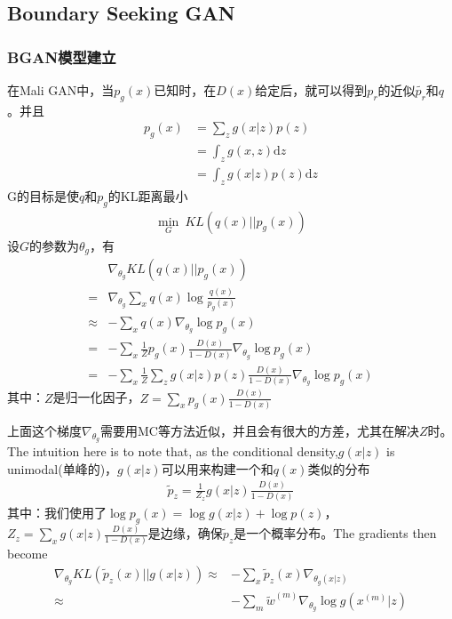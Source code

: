     \subsection{Boundary Seeking GAN}
        \subsubsection{BGAN模型建立}
            \par
            在Mali GAN中，当$p_g(x)$已知时，在$D(x)$给定后，就可以得到$p_r$的近似$\tilde{p_r}$和$q$。并且
            \begin{align*}
            p_g(x) & = \sum_z g(x|z)p(z)\\
            & =\int_zg(x,z)\mathrm{d}z\\
            & =\int_z g(x|z)p(z)\mathrm{d}z
            \end{align*}
            G的目标是使$q$和$p_g$的KL距离最小
            \begin{align*}
            \min_G \ KL(q(x)||p_g(x))
            \end{align*}
            设$G$的参数为$\theta_g$，有
            \begin{align*}
            &\nabla_{\theta_g} KL(q(x)||p_g(x))\\
            ={}&\nabla_{\theta_g} \sum_x q(x)\log \frac{q(x)}{p_g(x)}\\
            \approx{}&-\sum_x q(x)\nabla_{\theta_g}\log p_g(x)\\
            ={}&-\sum_x \frac{1}{Z}p_g(x)\frac{D(x)}{1-D(x)} \nabla_{\theta_g}\log p_g(x)\\
            ={}&-\sum_x \frac{1}{Z}\sum_z g(x|z)p(z)\frac{D(x)}{1-D(x)}\nabla_{\theta_g}\log p_g(x)
            \end{align*}
            其中：$Z$是归一化因子，$Z = \sum _x p_g(x)\frac{D(x)}{1-D(x)}$
            \par
            上面这个梯度$\nabla_{\theta_g}$需要用MC等方法近似，并且会有很大的方差，尤其在解决$Z$时。The intuition here is to note that, as the conditional density,$ g(x|z)$ is unimodal(单峰的)，$g(x|z)$可以用来构建一个和$q(x)$类似的分布
            \begin{align*}
            \tilde{p}_z = \frac{1}{Z_z} g(x|z) \frac{D(x)}{1-D(x)}
            \end{align*}
            其中：我们使用了$\log p_g(x) = \log g(x|z) + \log p(z)$，$Z_z = \sum_x g(x|z) \frac{D(x)}{1-D(x)}$是边缘，确保$\tilde{p}_z$是一个概率分布。The gradients then become
            \begin{align*}
            \nabla_{\theta_g} KL(\tilde{p}_z(x)||g(x|z)) \approx& -\sum _x\tilde{p}_z(x) \nabla_{\theta_g(x|z)}\\
            \approx& -\sum_m \tilde{w}^{(m)} \nabla_{\theta_g}\log g(x^{(m)}|z)
            \end{align*}
